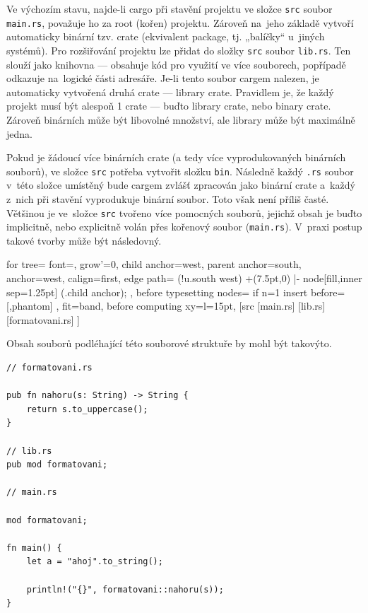 \documentclass[a4paper, 12pt, twoside]{article} %
\newcommand{\rust}[1]{\texttt{#1}}
\begin{document}
		Ve výchozím stavu, najde-li cargo při stavění projektu ve složce \texttt{src} soubor \texttt{main.rs}, považuje ho za root (kořen) projektu. Zároveň na~jeho základě vytvoří automaticky binární tzv. crate (ekvivalent package, tj. „balíčky“ u~jiných systémů). Pro rozšiřování projektu lze přidat do složky \texttt{src} soubor \rust{lib.rs}. Ten slouží jako knihovna — obsahuje kód pro využití ve více souborech, popřípadě odkazuje na~logické části adresáře. Je-li tento soubor cargem nalezen, je automaticky vytvořená druhá crate — library crate. Pravidlem je, že každý projekt musí být alespoň 1 crate — buďto library crate, nebo binary crate. Zároveň binárních může být libovolné množství, ale library může být maximálně jedna.

		Pokud je žádoucí více binárních crate (a tedy více vyprodukovaných binárních souborů), ve složce \texttt{src} potřeba vytvořit složku \texttt{bin}. Následně každý \texttt{.rs} soubor v~této složce umístěný bude cargem zvlášť zpracován jako binární crate a~každý z~nich při stavění vyprodukuje binární soubor. Toto však není příliš časté. Většinou je ve~složce \texttt{src} tvořeno více pomocných souborů, jejichž obsah je buďto implicitně, nebo explicitně volán přes kořenový soubor (\texttt{main.rs}). V~praxi postup takové tvorby může být následovný.
		\begin{center}
			\begin{forest}
				for tree={
				font=\ttfamily,
				grow'=0,
				child anchor=west,
				parent anchor=south,
				anchor=west,
				calign=first,
				edge path={
					\noexpand{}
					(!u.south west) +(7.5pt,0) |- node[fill,inner sep=1.25pt] {} (.child anchor);
				},
				before typesetting nodes={
					if n=1
					{insert before={[,phantom]}}
					{}
				},
				fit=band,
				before computing xy={l=15pt},
				}
			[src
				[main.rs]
				[lib.rs]
				[formatovani.rs]
			]
			\end{forest}
		\end{center}
		
		Obsah souborů podléhající této souborové struktuře by mohl být takovýto.
		\begin{verbatim}
// formatovani.rs

pub fn nahoru(s: String) -> String {
	return s.to_uppercase();
}

// lib.rs
pub mod formatovani;

// main.rs

mod formatovani;

fn main() {
	let a = "ahoj".to_string();
	
	println!("{}", formatovani::nahoru(s));
}
		\end{verbatim}
\end{document}
